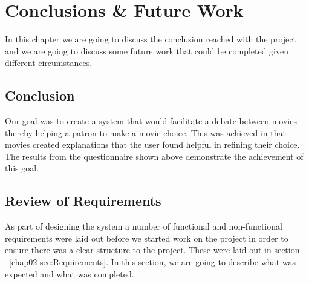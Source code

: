 \chapter{Conclusions \& Future Work} %
    In this chapter we are going to discuss the conclusion reached with the project and we are going to discuss some future work that could be completed given different circumstances. 

    \section{Conclusion}
        Our goal was to create a system that would facilitate a debate between movies thereby helping a patron to make a movie choice. This was achieved in that movies created explanations that the user found helpful in refining their choice. The results from the questionnaire shown above demonstrate the achievement of this goal. 

    \section{Review of Requirements}
        As part of designing the system a number of functional and non-functional requirements were laid out before we started work on the project in order to ensure there was a clear structure to the project. These were laid out in section ~\ref{chap02-sec:Requirements}. In this section, we are going to describe what was expected and what was completed. 


